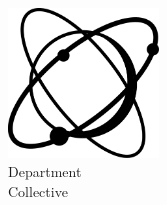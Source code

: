 \begin{titlepage}
  \makeatletter
  \begin{center}
    \begin{LARGE}
      \textbf{\@title} \\
    \end{LARGE}
    \vspace*{10pt}
    \textbf{\@author} \\
    \vfill
    \includegraphics[width=0.3\textwidth]{figures/logos/placeholderLogo.pdf} \\
    \vspace*{10pt}
    Department \\
    Collective \\
    \vfill
    \purpose \\
    \@date
  \end{center}
  \makeatother
  \restoregeometry
\end{titlepage}
